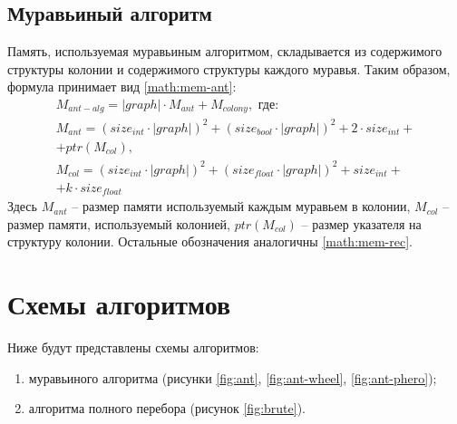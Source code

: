 \subsection{Муравьиный алгоритм}
Память, используемая муравьиным алгоритмом, складывается из содержимого структуры колонии и содержимого структуры каждого муравья. Таким образом, формула принимает вид \ref{math:mem-ant}:
\begin{equation}\label{math:mem-ant}
    \begin{array}{l}
    M_{ant-alg} = |graph| \cdot M_{ant} + M_{colony}, \text{ где:} \\
    M_{ant} = \left(size_{int} \cdot |graph|\right)^2 + \left(size_{bool} \cdot |graph|\right)^2 + 2 \cdot size_{int} + \\
    + ptr\left(M_{col}\right), \\
    M_{col} = \left(size_{int} \cdot |graph|\right)^2 + \left(size_{float} \cdot |graph|\right)^2 + size_{int} + \\
    + k \cdot size_{float}
    \end{array}
\end{equation}
Здесь $M_{ant}$ -- размер памяти используемый каждым муравьем в колонии, $M_{col}$ -- размер памяти, используемый колонией, $ptr\left(M_{col}\right)$ -- размер указателя на структуру колонии. Остальные обозначения аналогичны \ref{math:mem-rec}.
	
	\section{Схемы алгоритмов}
        Ниже будут представлены схемы алгоритмов: \begin{enumerate}
            \item муравьиного алгоритма (рисунки \ref{fig:ant}, \ref{fig:ant-wheel}, \ref{fig:ant-phero});
            \item алгоритма полного перебора (рисунок \ref{fig:brute}).
        \end{enumerate}

